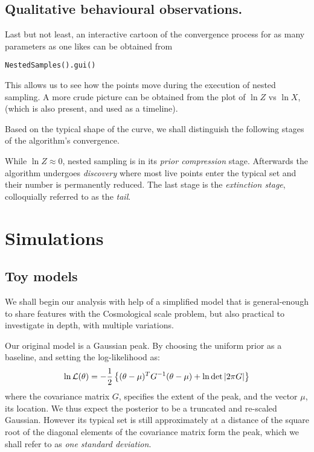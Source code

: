 \documentclass[usenatbib]{mnras}
\begin{document}
\subsection{Qualitative behavioural observations.}
\label{sec:org41ffa53}
Last but not least, an interactive cartoon of the convergence
process for as many parameters as one likes can be obtained from

\begin{verbatim}
NestedSamples().gui()
\end{verbatim}
This allows us to see how the points move during the execution of
nested sampling. A more crude picture can be obtained from the plot
of \(\ln Z\) vs \(\ln X\), (which is also present, and used as a
timeline).

Based on the typical shape of the curve, we shall distinguish the
following stages of the algorithm's convergence. 

While \(\ln Z \approx 0\), nested sampling is in its \emph{prior
compression} stage.  Afterwards the algorithm undergoes \emph{discovery}
where most live points enter the typical set and their number is
permanently reduced. The last stage is the \emph{extinction stage},
colloquially referred to as the \emph{tail}.


\section{Simulations}
\label{sec:org7eeaaa2}
\subsection{Toy models}
\label{sec:org1d8dd99}

We shall begin our analysis with help of a simplified model that is
general-enough to share features with the Cosmological scale
problem, but also practical to investigate in depth, with multiple
variations.

Our original model is a Gaussian peak. By choosing the uniform prior as a baseline, and setting the log-likelihood as:
\begin{equation}
  \ln {\cal L}(\theta) = - \frac{1}{2} \left\{(\theta - \mu)^{T}G^{-1}(\theta-\mu)  + \ln \det \left| 2\pi G\right| \right\}
\end{equation}
where the covariance matrix \(G\), specifies the extent of the peak,
and the vector \(\mu\), its location. We thus expect the posterior to
be a truncated and re-scaled Gaussian. However its typical set is
still approximately at a distance of the square root of the diagonal elements of the
covariance matrix form the peak, which we shall refer to as \emph{one
standard deviation}.
\end{document}
